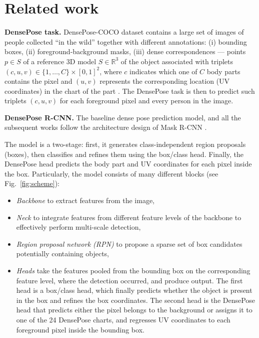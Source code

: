 \section{Related work}

\noindent 
\textbf{DensePose task.} DensePose-COCO dataset contains a large set of images of people collected ``in the wild'' together with different annotations: (i) bounding boxes, (ii) foreground-background masks, (iii) dense correspondences --- points $p \in S$ of a reference 3D model $S\in\mathbb{R}^3$ of the object associated with triplets $(c, u, v) \in\{1, \ldots, C\} \times[0,1]^{2}$, where $c$ indicates which one of $C$ body parts contains the pixel and $(u,v)$ represents the corresponding location (UV coordinates) in the chart of the part \cite{smpl}.
The DensePose task is then to predict such triplets $(c, u, v)$ for each foreground pixel and every person in the image.
\newline

\noindent \textbf{DensePose R-CNN.} The baseline dense pose prediction model, and all the subsequent works \cite{parsing, uncertainty, monkeys} follow the architecture design of Mask R-CNN \cite{maskrcnn}.

The model is a two-stage: first, it generates class-independent region proposals (boxes), then classifies and refines them using the box/class head. Finally, the DensePose head predicts the body part and UV coordinates for each pixel inside the box. Particularly, the model consists of many different blocks (see Fig.~\ref{fig:scheme}):
\begin{itemize}
    \item \textit{Backbone} to extract features from the image,
    \item \textit{Neck} to integrate features from different feature levels of the backbone to effectively perform multi-scale detection,
    \item \textit{Region proposal network (RPN)} to propose a sparse set of box candidates potentially containing objects,
    \item \textit{Heads} take the features pooled from the bounding box on the corresponding feature level, where the detection occurred, and produce output. The first head is a box/class head, which finally predicts whether the object is present in the box and refines the box coordinates. The second head is the DensePose head that predicts either the pixel belongs to the background or assigns it to one of the 24 DensePose charts, and regresses UV coordinates to each foreground pixel inside the bounding box.
\end{itemize}

